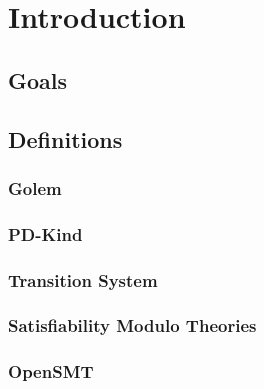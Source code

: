 \chapter{Introduction}

\section{Goals}

\section{Definitions}

\subsection{Golem}

\subsection{PD-Kind}

\subsection{Transition System}

\subsection{Satisfiability Modulo Theories}

\subsection{OpenSMT}

